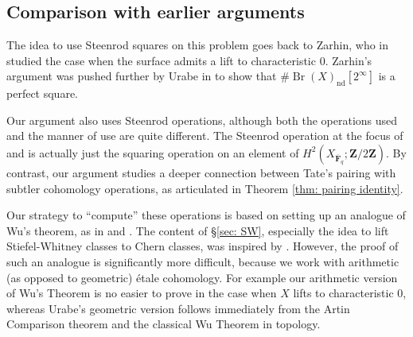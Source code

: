 \documentclass[10pt, reqno]{amsart}
\numberwithin{equation}{subsection}
\newcommand{\F}{\mathbf{F}}
\newcommand{\Z}{\mathbf{Z}}
\newcommand{\ol}[1]{\overline{#1}}
\DeclareMathOperator{\et}{\acute{e}t}
\DeclareMathOperator{\Br}{Br}
\DeclareMathOperator{\nd}{nd}
\theoremstyle{remark}
\begin{document}

\subsection{Comparison with earlier arguments}
The idea to use Steenrod squares on this problem goes back to Zarhin, who in \cite{Zar} studied the case when the surface admits a lift to characteristic $0$. Zarhin's argument was pushed further by Urabe in \cite{Urabe96} to show that $\# \Br(X)_{\nd}[2^{\infty}]$ is a perfect square. 

Our argument also uses Steenrod operations, although both the operations used and the manner of use are quite different. The Steenrod operation at the focus of \cite{Zar} and \cite{Urabe96} is actually just the squaring operation on an element of $H^2_{\et}(X_{\ol{\F}_q}; \Z/2\Z)$. By contrast, our argument studies a deeper connection between Tate's pairing with subtler cohomology operations, as articulated in Theorem \ref{thm: pairing identity}. 

Our strategy to ``compute'' these operations is based on setting up an analogue of Wu's theorem, as in \cite{Zar} and \cite{Urabe96}. The content of \S \ref{sec: SW}, especially the idea to lift Stiefel-Whitney classes to Chern classes, was inspired by \cite{Urabe96}. However, the proof of such an analogue is significantly more difficult, because we work with arithmetic (as opposed to geometric) \'{e}tale cohomology. For example our arithmetic version of Wu's Theorem is no easier to prove in the case when $X$ lifts to characteristic $0$, whereas Urabe's geometric version follows immediately from the Artin Comparison theorem and the classical Wu Theorem in topology. 
\end{document}
